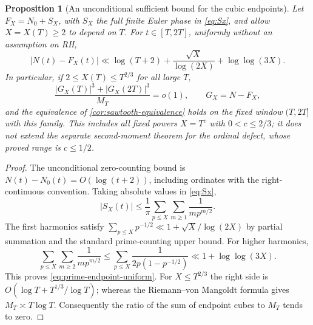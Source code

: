 \documentclass[11pt,reqno]{amsart}
\numberwithin{equation}{section}
\newtheorem{proposition}[theorem]{Proposition}
\begin{document}
\begin{proposition}[An unconditional sufficient bound for the cubic endpoints]
\label{prop:prime-endpoint-range}
Let $F_X=N_0+S_X$, with $S_X$ the full finite Euler
phase in \eqref{eq:Sx}, and allow $X=X(T)\ge2$ to depend on $T$.
For $t\in[T,2T]$, uniformly without an assumption on RH,
\begin{equation}\label{eq:prime-endpoint-uniform}
 |N(t)-F_X(t)|
 \ll \log(T+2)+\frac{\sqrt X}{\log(2X)}
                 +\log\log(3X).
\end{equation}
In particular, if $2\le X(T)\le T^{2/3}$ for all large $T$,
\begin{equation}\label{eq:prime-endpoint-vanishes}
 \frac{|G_X(T)|^3+|G_X(2T)|^3}{M_T}=o(1),\qquad
 G_X=N-F_X,
\end{equation}
and the equivalence of \cref{cor:sawtooth-equivalence} holds
on the fixed window $(T,2T]$ with this family.  This includes
all fixed powers $X=T^c$ with $0<c\le2/3$; it does not extend
the separate second-moment theorem for the ordinal defect, whose
proved range is $c\le1/2$.
\end{proposition}
\begin{proof}
The unconditional zero-counting bound is
$N(t)-N_0(t)=O(\log(t+2))$, including ordinates with the
right-continuous convention.  Taking absolute values in
\eqref{eq:Sx},
\[
 |S_X(t)|\le\frac1\pi\sum_{p\le X}\sum_{m\ge1}
              \frac1{m p^{m/2}}.
\]
The first harmonics satisfy
$\sum_{p\le X}p^{-1/2}\ll1+\sqrt X/\log(2X)$ by
partial summation and the standard prime-counting upper bound.
For higher harmonics,
\[
 \sum_{p\le X}\sum_{m\ge2}\frac1{m p^{m/2}}
 \le \sum_{p\le X}\frac{1}{2p(1-p^{-1/2})}
 \ll 1+\log\log(3X).
\]
This proves \eqref{eq:prime-endpoint-uniform}.  For
$X\le T^{2/3}$ the right side is
$O(\log T+T^{1/3}/\log T)$; whereas the Riemann--von
Mangoldt formula gives $M_T\asymp T\log T$.  Consequently the
ratio of the sum of endpoint cubes to $M_T$ tends to zero.
\end{proof}
\end{document}
